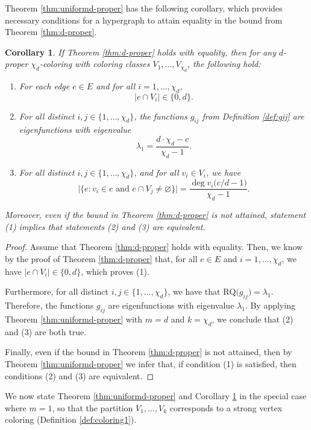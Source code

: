 \documentclass{article}
\newcommand{\RQ}{\textrm{RQ}}
\theoremstyle{plain}
\newtheorem{corollary}[theorem]{Corollary}
\theoremstyle{definition}
\theoremstyle{remark}
\begin{document}
Theorem \ref{thm:uniformd-proper} has the following corollary, which provides necessary conditions for a hypergraph to attain equality in the bound from Theorem \ref{thm:d-proper}.


\begin{corollary}\label{cor:d-propersharp}
   If Theorem \ref{thm:d-proper} holds with equality, then for any $d$-proper $\chi_d$-coloring with coloring classes $V_1,\ldots,V_{\chi_d}$, the following hold:
    \begin{enumerate}
        \item For each edge $e\in E$ and for all $i=1,\ldots,\chi_d$,
        \[
        \bigl|e\cap V_i\bigr| \in \bigl\{0,d \bigr\}.
        \]
        \item For all distinct $i,j \in\{ 1,\ldots,\chi_d\}$, the functions $g_{ij}$ from Definition \ref{def:gij} are eigenfunctions with eigenvalue \[\lambda_1 = \frac{d\cdot \chi_d - c}{\chi_d-1}.\]
        \item For all distinct $i,j\in\{1,\ldots,\chi_d\}$, and for all $v_i\in V_i$, we have
        \[
        \bigl| \bigl\{ e\colon v_i\in e \text{ and } e\cap V_j\neq \varnothing \bigr\}\bigr| = \frac{\deg v_i\bigl( c/d-1\bigr)}{\chi_d-1}.
        \]
    \end{enumerate}

    Moreover, even if the bound in Theorem \ref{thm:d-proper} is not attained, statement \textup{(1)} implies that statements \textup{(2)} and \textup{(3)} are equivalent.
\end{corollary}
\begin{proof}
    Assume that Theorem \ref{thm:d-proper} holds with equality. Then, we know by the proof of Theorem \ref{thm:d-proper} that, for all $e\in E$ and $i=1,\ldots,\chi_d$, we have $\bigl|e\cap V_i\bigr|\in \bigl\{0,d\bigr\}$, which proves (1).
    
    Furthermore, for all distinct $i,j\in\{1,\ldots,\chi_d\}$, we have that $\RQ\bigl(g_{ij}\bigr)=\lambda_1$. Therefore, the functions $g_{ij}$ are eigenfunctions with eigenvalue $\lambda_1$. By applying Theorem \ref{thm:uniformd-proper} with $m=d$ and $k=\chi_d$, we conclude that (2) and (3) are both true.
    
    Finally, even if the bound in Theorem \ref{thm:d-proper} is not attained, then by Theorem \ref{thm:uniformd-proper} we infer that, if condition (1) is satisfied, then conditions (2) and (3) are equivalent.
\end{proof}
We now state Theorem \ref{thm:uniformd-proper} and Corollary \ref{cor:d-propersharp} in the special case where $m=1$, so that the partition $V_1,\ldots,V_k$ corresponds to a strong vertex coloring (Definition \ref{def:coloring1}).
\end{document}
